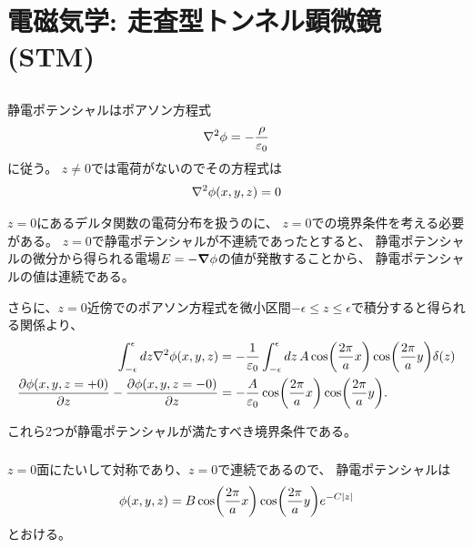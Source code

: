 \documentclass[../../master.tex]{subfiles}
\begin{document}
\chapter{電磁気学: 走査型トンネル顕微鏡(STM)}
\section{}
\subsection{}
静電ポテンシャルはポアソン方程式
\begin{equation}\begin{aligned}[b]
    \laplacian{\phi} = -\frac{\rho}{\varepsilon_0}
\end{aligned}\end{equation}
に従う。
\(z\neq0\)では電荷がないのでその方程式は
\begin{equation}\begin{aligned}[b]
    \laplacian{\phi(x,y,z)} = 0
\end{aligned}\end{equation}

\(z=0\)にあるデルタ関数の電荷分布を扱うのに、
\(z=0\)での境界条件を考える必要がある。
\(z=0\)で静電ポテンシャルが不連続であったとすると、
静電ポテンシャルの微分から得られる電場\(E=-\grad \phi\)の値が発散することから、
静電ポテンシャルの値は連続である。

さらに、\(z=0\)近傍でのポアソン方程式を微小区間\(-\epsilon\le z\le \epsilon\)で積分すると得られる関係より、
\begin{equation}\begin{aligned}[b]
    \int_{-\epsilon}^{\epsilon}dz \laplacian{\phi(x,y,z)}
        &= -\frac{1}{\varepsilon_0}\int_{-\epsilon}^{\epsilon}dz\, A\cos(\frac{2\pi}{a}x)\cos(\frac{2\pi}{a}y)\delta(z)\\
    \pdv{\phi(x,y,z=+0)}{z}-\pdv{\phi(x,y,z=-0)}{z}
        &= -\frac{A}{\varepsilon_0}\cos(\frac{2\pi}{a}x)\cos(\frac{2\pi}{a}y).
\end{aligned}\end{equation}

これら2つが静電ポテンシャルが満たすべき境界条件である。

\subsection{}
\(z=0\)面にたいして対称であり、\(z=0\)で連続であるので、
静電ポテンシャルは
\begin{equation}\begin{aligned}[b]
    \phi(x,y,z) = B\cos(\frac{2\pi}{a}x)\cos(\frac{2\pi}{a}y)e^{-C\abs{z}}
\end{aligned}\end{equation}
とおける。
\end{document}
